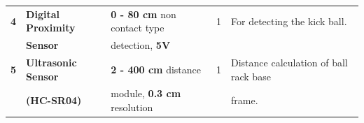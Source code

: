 \begin{table}[h]
\begin{tabular}{|c|l|l|c|l|}
                    \textbf{4}      & \textbf{Digital Proximity}        & \textbf{0 - 80 cm} non contact type   &        1          & For detecting the kick ball.                              \\
                                    & \textbf{Sensor}                   & detection, \textbf{ 5V}               &                   &                                                           \\ \hline                                    
                    \textbf{5}      & \textbf{Ultrasonic Sensor}        & \textbf{2 - 400 cm} distance          &        1          & Distance calculation of ball rack base                    \\ 
                                    & \textbf{(HC-SR04)}                & module, \textbf{0.3 cm} resolution    &                   & frame.                                                    \\ \hline   \hline
                \end{tabular}
            \end{table}


